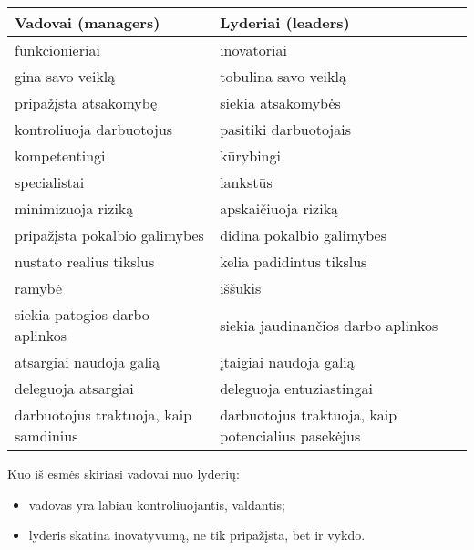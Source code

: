 \begin{tabularx}{\textwidth}[]{X | X}
  Vadovai (managers) & Lyderiai (leaders) \\
  \hline
  funkcionieriai & inovatoriai \\
  gina savo veiklą & tobulina savo veiklą \\
  pripažįsta atsakomybę & siekia atsakomybės \\
  kontroliuoja darbuotojus & pasitiki darbuotojais \\
  kompetentingi & kūrybingi \\
  specialistai & lankstūs \\
  minimizuoja riziką & apskaičiuoja riziką \\
  pripažįsta pokalbio galimybes & didina pokalbio galimybes \\
  nustato realius tikslus & kelia padidintus tikslus \\
  ramybė & iššūkis \\
  siekia patogios darbo aplinkos & siekia jaudinančios darbo aplinkos \\
  atsargiai naudoja galią & įtaigiai naudoja galią \\
  deleguoja atsargiai & deleguoja entuziastingai \\
  darbuotojus traktuoja, kaip samdinius & darbuotojus traktuoja, kaip
  potencialius pasekėjus
\end{tabularx}

Kuo iš esmės skiriasi vadovai nuo lyderių:
\begin{itemize}
  \item vadovas yra labiau kontroliuojantis, valdantis;
  \item lyderis skatina inovatyvumą, ne tik pripažįsta, bet ir vykdo.
\end{itemize}
